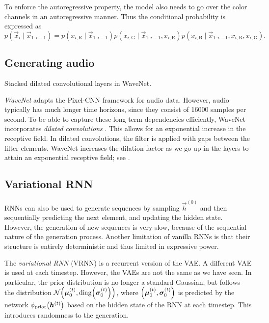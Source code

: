 To enforce the autoregressive property, the model also needs to go over the color channels in an
autoregressive manner. Thus the conditional probability is expressed as \[
    p(\vec{x}_i \mid \vec{x}_{1:i-1}) = p(x_{i,\mathrm{R}} \mid \vec{x}_{1:i-1}) p(x_{i,\mathrm{G}} \mid \vec{x}_{1:i-1}, x_{i,\mathrm{R}}) p(x_{i,\mathrm{B}} \mid \vec{x}_{1:i-1}, x_{i,\mathrm{R}}, x_{i,\mathrm{G}}).
\]

\subsection{Generating audio}

\begin{marginfigure}
    \centering
    \caption{Stacked dilated convolutional layers in WaveNet.}
    \label{fig:dilated-convolutions}
\end{marginfigure}

\textit{WaveNet} \citep{oord2016wavenet} adapts the Pixel-CNN framework for audio data. However,
audio typically has much longer time horizons, since they consist of 16000 samples per second. To be
able to capture these long-term dependencies efficiently, WaveNet incorporates \textit{dilated
    convolutions} \citep{yu2016multiscale}. This allows for an exponential increase in the receptive
field. In dilated convolutions, the filter is applied with gaps between the filter elements. WaveNet
increases the dilation factor as we go up in the layers to attain an exponential receptive field; see
.

\subsection{Variational RNN}

RNNs can also be used to generate sequences by sampling $\vec{h}^{(0)}$ and then sequentially
predicting the next element, and updating the hidden state. However, the generation of new
sequences is very slow, because of the sequential nature of the generation process. Another
limitation of vanilla RNNs is that their structure is entirely deterministic and thus limited in
expressive power.

The \textit{variational RNN} \citep{chung2015recurrent} (VRNN) is a recurrent version of the VAE. A
different VAE is used at each timestep. However, the VAEs are not the same as we have seen. In
particular, the prior distribution is no longer a standard Gaussian, but follows the distribution
$\mathcal{N}\lft(\vec{\mu}_0^{(t)}, \mathrm{diag}\lft(\vec{\sigma}_0^{(t)}\rgt)\rgt)$, where
$\lft(\vec{\mu}_0^{(t)}, \vec{\sigma}_0^{(t)}\rgt)$ is predicted by the network
$\phi_{\mathrm{prior}}\lft(\vec{h}^{(t)}\rgt)$ based on the hidden state of the RNN at each
timestep. This introduces randomness to the generation.

